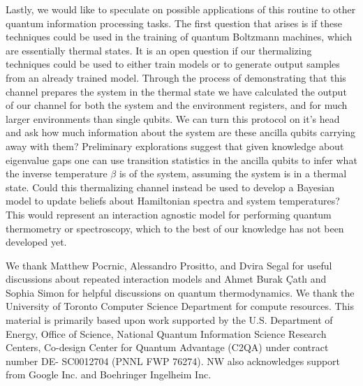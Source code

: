 \documentclass[
 amsmath,amssymb,
 aps,
onecolumn, 
nofootinbib]{revtex4-2}
\begin{document}
Lastly, we would like to speculate on possible applications of this routine to other quantum information processing tasks. The first question that arises is if these techniques could be used in the training of quantum Boltzmann machines, which are essentially thermal states. It is an open question if our thermalizing techniques could be used to either train models or to generate output samples from an already trained model. Through the process of demonstrating that this channel prepares the system in the thermal state we have calculated the output of our channel for both the system and the environment registers, and for much larger environments than single qubits. We can turn this protocol on it's head and ask how much information about the system are these ancilla qubits carrying away with them? Preliminary explorations suggest that given knowledge about eigenvalue gaps one can use transition statistics in the ancilla qubits to infer what the inverse temperature $\beta$ is of the system, assuming the system is in a thermal state. Could this thermalizing channel instead be used to develop a Bayesian model to update beliefs about Hamiltonian spectra and system temperatures? This would represent an interaction agnostic model for performing quantum thermometry or spectroscopy, which to the best of our knowledge has not been developed yet. 

\begin{acknowledgments}
We thank Matthew Pocrnic, Alessandro Prositto, and Dvira Segal for useful discussions about repeated interaction models and Ahmet Burak Çatlı and Sophia Simon for helpful discussions on quantum thermodynamics. We thank the University of Toronto Computer Science Department for compute resources. This material is primarily based upon work supported by the U.S. Department of Energy, Office of Science, National Quantum Information Science Research Centers, Co-design Center for Quantum Advantage (C2QA) under contract number DE- SC0012704 (PNNL FWP 76274).  NW also acknowledges support from Google Inc. and Boehringer Ingelheim Inc.
\end{acknowledgments}



\appendix 
\end{document}
